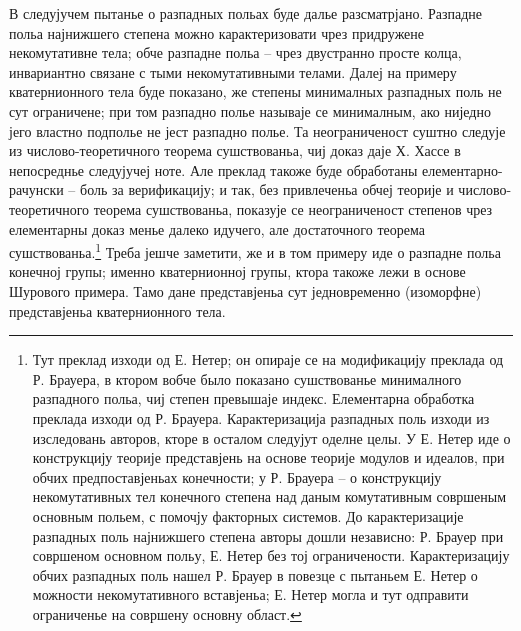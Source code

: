 \documentclass[11pt]{article}
\begin{document}
\setcounter{footnote}{0}

\noindent В следујучем пытанье о разпадных польах буде далье разсматрјано. Разпадне польа најнижшего степена можно карактеризовати чрез придружене некомутативне тела; обче разпадне польа -- чрез двустранно просте колца, инвариантно связане с тыми некомутативными телами. Далеј на примеру кватернионного тела буде показано, же степены минималных разпадных поль не сут ограничене; при том разпадно полье называје се минималным, ако ниједно јего властно подполье не јест разпадно полье. Та неограниченост суштно следује из числово-теоретичного теорема сушствованьа, чиј доказ даје Х. Хассе в непосреднье следујучеј ноте. Але преклад такоже буде обработаны елементарно-рачунски -- боль за верификацију; и так, без привлеченьа обчеј теорије и числово-теоретичного теорема сушствованьа, показује се неограниченост степенов чрез елементарны доказ менье далеко идучего, але достаточного теорема сушствованьа.\footnote{Тут преклад изходи од Е. Нетер; он опираје се на модификацију преклада од Р. Брауера, в ктором вобче было показано сушствованье минималного разпадного польа, чиј степен превышаје индекс. Елементарна обработка преклада изходи од Р. Брауера. Карактеризација разпадных поль изходи из изследовань авторов, кторе в осталом следујут оделне целы. У Е. Нетер иде о конструкцију теорије представјень на основе теорије модулов и идеалов, при обчих предпоставјеньах конечности; у Р. Брауера -- о конструкцију некомутативных тел конечного степена над даным комутативным совршеным основным польем, с помочју факторных системов. До карактеризације разпадных поль најнижшего степена авторы дошли независно: Р. Брауер при совршеном основном польу, Е. Нетер без тој ограничености. Карактеризацију обчих разпадных поль нашел Р. Брауер в повезце с пытаньем Е. Нетер о можности некомутативного вставјеньа; Е. Нетер могла и тут одправити ограниченье на совршену основну област.} Треба јешче заметити, же и в том примеру иде о разпадне польа конечној групы; именно кватернионној групы, ктора такоже лежи в основе Шурового примера. Тамо дане представјеньа сут једновременно (изоморфне) представјеньа кватернионного тела.
\end{document}

